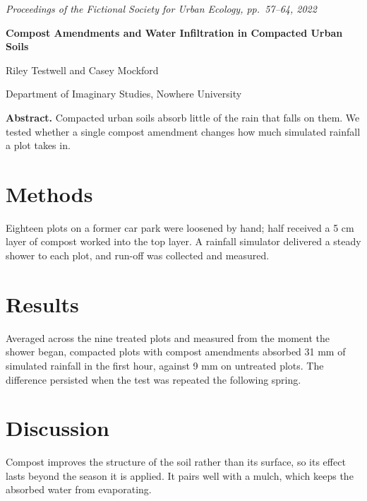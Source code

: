 \documentclass[10pt]{article}
\begin{document}
\begin{center}
{\small\itshape Proceedings of the Fictional Society for Urban Ecology, pp.~57--64, 2022\par}\vspace{10pt}
{\LARGE\bfseries Compost Amendments and Water Infiltration in Compacted Urban Soils\par}\vspace{8pt}
{\large Riley Testwell and Casey Mockford\par}\vspace{4pt}
{\small Department of Imaginary Studies, Nowhere University\par}
\end{center}
\vspace{6pt}
\noindent\textbf{Abstract.} Compacted urban soils absorb little of the rain that falls on them. We tested whether a single compost amendment changes how much simulated rainfall a plot takes in.

\section*{Methods}
Eighteen plots on a former car park were loosened by hand; half received a 5 cm layer of compost worked into the top layer. A rainfall simulator delivered a steady shower to each plot, and run-off was collected and measured.

\section*{Results}
Averaged across the nine treated plots and measured from the moment the shower began, compacted plots with compost amendments absorbed 31 mm of simulated rainfall in the first hour, against 9 mm on untreated plots. The difference persisted when the test was repeated the following spring.

\section*{Discussion}
Compost improves the structure of the soil rather than its surface, so its effect lasts beyond the season it is applied. It pairs well with a mulch, which keeps the absorbed water from evaporating.
\end{document}
